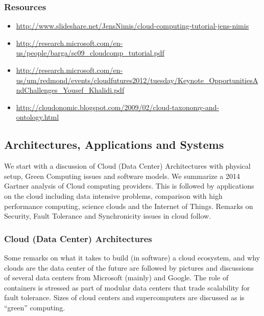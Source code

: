 
\subsubsection{Resources}\label{resources-2}

\begin{itemize}
\item
  \url{http://www.slideshare.net/JensNimis/cloud-computing-tutorial-jens-nimis}
\item
  \url{http://research.microsoft.com/en-us/people/barga/sc09_cloudcomp_tutorial.pdf}
\item
  \url{http://research.microsoft.com/en-us/um/redmond/events/cloudfutures2012/tuesday/Keynote_OpportunitiesAndChallenges_Yousef_Khalidi.pdf}
\item
  \url{http://cloudonomic.blogspot.com/2009/02/cloud-taxonomy-and-ontology.html}
\end{itemize}

\subsection{Architectures,  Applications and Systems}

We start with a discussion of Cloud (Data Center) Architectures with
physical setup, Green Computing issues and software models. We summarize
a 2014 Gartner analysis of Cloud computing providers. This is followed
by applications on the cloud including data intensive problems,
comparison with high performance computing, science clouds and the
Internet of Things. Remarks on Security, Fault Tolerance and
Synchronicity issues in cloud follow.



\subsubsection{Cloud (Data Center) Architectures}

Some remarks on what it takes to build (in software) a cloud ecosystem,
and why clouds are the data center of the future are followed by
pictures and discussions of several data centers from Microsoft (mainly)
and Google. The role of containers is stressed as part of modular data
centers that trade scalability for fault tolerance. Sizes of cloud
centers and supercomputers are discussed as is ``green'' computing.



